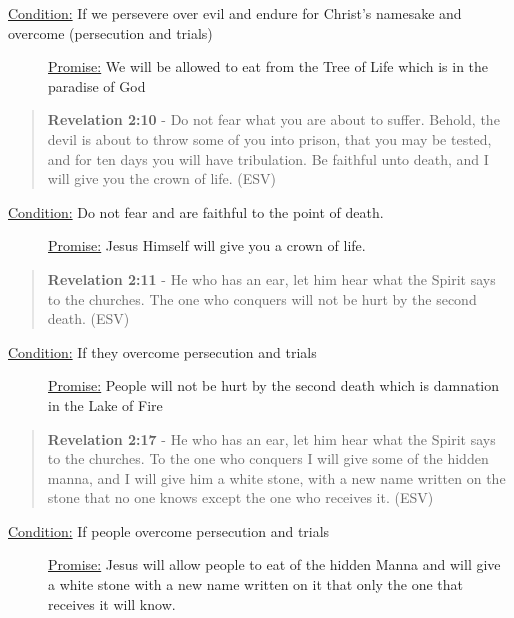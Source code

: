 \documentclass[11pt]{article}
\begin{document}
\begin{description}
\item[{\uline{Condition:} If we persevere over evil and endure for Christ's namesake and overcome (persecution and trials)}] \uline{Promise:} We will be allowed to eat from the Tree of Life which is in the paradise of God
\end{description}

\begin{quote}
\textbf{Revelation 2:10} - Do not fear what you are about to suffer. Behold, the devil is about to throw some of you into prison, that you may be tested, and for ten days you will have tribulation. Be faithful unto death, and I will give you the crown of life. (ESV)
\end{quote}

\begin{description}
\item[{\uline{Condition:} Do not fear and are faithful to the point of death.}] \uline{Promise:} Jesus Himself will give you a crown of life.
\end{description}

\begin{quote}
\textbf{Revelation 2:11} - He who has an ear, let him hear what the Spirit says to the churches. The one who conquers will not be hurt by the second death. (ESV)
\end{quote}

\begin{description}
\item[{\uline{Condition:} If they overcome persecution and trials}] \uline{Promise:} People will not be hurt by the second death which is damnation in the Lake of Fire
\end{description}

\begin{quote}
\textbf{Revelation 2:17} - He who has an ear, let him hear what the Spirit says to the churches. To the one who conquers I will give some of the hidden manna, and I will give him a white stone, with a new name written on the stone that no one knows except the one who receives it. (ESV)
\end{quote}

\begin{description}
\item[{\uline{Condition:} If people overcome persecution and trials}] \uline{Promise:} Jesus will allow people to eat of the hidden Manna and will give a white stone with a new name written on it that only the one that receives it will know.
\end{description}
\end{document}
